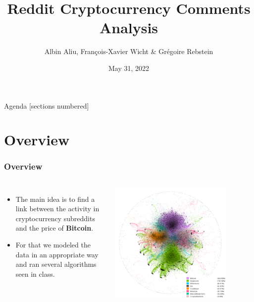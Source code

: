 \documentclass[aspectratio=169]{beamer}
\title{Reddit Cryptocurrency Comments Analysis}
\date{May 31, 2022}
\author{Albin Aliu, François-Xavier Wicht \& Grégoire Rebstein}
\institute{Social Media Analytics}
\begin{document}
\maketitle

\begin{frame}{Agenda}
    [sections numbered]
    \tableofcontents
\end{frame}
\section{Overview}
\begin{frame}[t]
    \frametitle{Overview}
    \begin{columns}
        \begin{itemize}
            \item The main idea is to find a link between the activity in cryptocurrency subreddits and the price of \textbf{Bitcoin}.
            \item For that we modeled the data in an appropriate way and ran several algorithms seen in class.
        \end{itemize}
        \includegraphics[width=0.8\textwidth]{figures/subreddits_labelled.png}
    \end{columns}
\end{frame}
\end{document}
